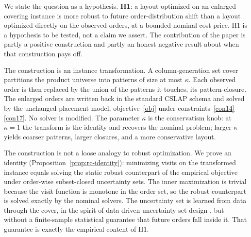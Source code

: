 \documentclass[preprint,review,11pt,authoryear]{elsarticle}
\begin{document}
We state the question as a hypothesis. \textbf{H1}: a layout optimized on an enlarged covering instance is more robust to future order-distribution shift than a layout optimized directly on the observed orders, at a bounded nominal-cost price. H1 is a hypothesis to be tested, not a claim we assert. The contribution of the paper is partly a positive construction and partly an honest negative result about when that construction pays off.

The construction is an instance transformation. A column-generation set cover partitions the product universe into patterns of size at most $\kappa$. Each observed order is then replaced by the union of the patterns it touches, its pattern-closure. The enlarged orders are written back in the standard CSLAP schema and solved by the unchanged placement model, objective~\eqref{obj} under constraints~\eqref{con14}--\eqref{con17}. No solver is modified. The parameter $\kappa$ is the conservatism knob: at $\kappa=1$ the transform is the identity and recovers the nominal problem; larger $\kappa$ yields coarser patterns, larger closures, and a more conservative layout.

The construction is not a loose analogy to robust optimization. We prove an identity (Proposition~\ref{prop:rc-identity}): minimizing visits on the transformed instance equals solving the static robust counterpart of the empirical objective under order-wise subset-closed uncertainty sets. The inner maximization is trivial because the visit function is monotone in the order set, so the robust counterpart is solved exactly by the nominal solvers. The uncertainty set is learned from data through the cover, in the spirit of data-driven uncertainty-set design \citep{bgk2018}, but without a finite-sample statistical guarantee that future orders fall inside it. That guarantee is exactly the empirical content of H1.
\end{document}
